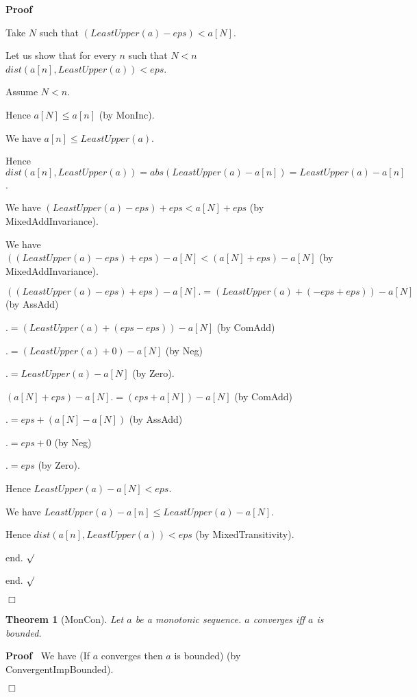 \documentclass{article}
\newenvironment{forthel}{\begin{leftbar}}{\end{leftbar}}
\newenvironment{proof}{\noindent\textbf{Proof\ }}{\hspace*{\fill}$\Box$\medskip}
\newenvironment{subproof}{\begin{list}{}{}
		\item[\text{Proof}]}{\hfill $\surd$ \end{list}}
\newtheorem{theorem}{Theorem}
\begin{document}
\begin{forthel}
\begin{proof}
\begin{subproof}
			Take $N$ such that $(LeastUpper(a) - eps) < a[N]$.
			
			Let us show that for every $n$ such that $N < n$ $dist(a[n],LeastUpper(a)) < eps$.
			
			\begin{subproof}
				Assume $N < n$.
				
				Hence $a[N] \leq a[n]$ (by MonInc).
				
				We have $a[n] \leq LeastUpper(a)$.
				
				Hence $dist(a[n],LeastUpper(a)) = abs(LeastUpper(a) - a[n]) = LeastUpper(a) - a[n]$.
				
				We have $(LeastUpper(a) - eps) + eps < a[N] + eps$ (by MixedAddInvariance).
				
				We have $((LeastUpper(a) - eps) + eps) - a[N] < (a[N] + eps) - a[N]$ (by MixedAddInvariance).
				
				$((LeastUpper(a) - eps) + eps) - a[N] .= (LeastUpper(a) + (-eps + eps)) - a[N]$ (by AssAdd)
				
				$.= (LeastUpper(a) + (eps - eps)) - a[N]$ (by ComAdd)
				
				$.= (LeastUpper(a) + 0) - a[N]$ (by Neg)
				
				$.= LeastUpper(a) - a[N]$ (by Zero).
				
				$(a[N] + eps) - a[N] .= (eps + a[N]) - a[N]$ (by ComAdd)
				
				$.= eps + (a[N] - a[N])$ (by AssAdd)
				
				$.= eps + 0$ (by Neg)
				
				$.= eps$ (by Zero).
				
				Hence $LeastUpper(a) - a[N] < eps$.
				
				We have $LeastUpper(a) - a[n] \leq LeastUpper(a) - a[N]$.
				
				Hence $dist(a[n],LeastUpper(a)) < eps$ (by MixedTransitivity).
				
				end.
			\end{subproof}
			
			end.
		\end{subproof}
	\end{proof}
	
	\begin{theorem}[MonCon]
		Let $a$ be a monotonic sequence. $a$ converges iff $a$ is bounded.
	\end{theorem}
	
	\begin{proof}
		We have (If $a$ converges then $a$ is bounded) (by ConvergentImpBounded).
		

\end{proof}
\end{forthel}
\end{document}
